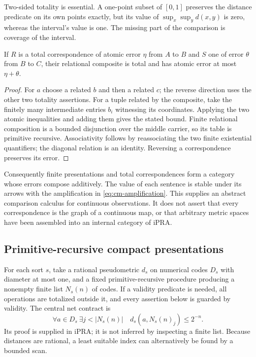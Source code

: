 Two-sided totality is essential. A one-point subset of $[0,1]$ preserves
the distance predicate on its own points exactly, but its value of
$\sup_x\sup_y d(x,y)$ is zero, whereas the interval's value is one.
The missing part of the comparison is coverage of the interval.

\begin{proposition}
\label{prop:cm-compose}
If $R$ is a total correspondence of atomic error $\eta$ from $A$ to $B$
and $S$ one of error $\theta$ from $B$ to $C$, their relational composite
is total and has atomic error at most $\eta+\theta$.
\end{proposition}
\begin{proof}
For $a$ choose a related $b$ and then a related $c$; the reverse direction
uses the other two totality assertions. For a tuple related by the
composite, take the finitely many intermediate entries $b_i$ witnessing
its coordinates. Applying the two atomic inequalities and adding them
gives the stated bound. Finite relational composition is a bounded
disjunction over the middle carrier, so its table is primitive recursive.
Associativity follows by reassociating the two finite existential
quantifiers; the diagonal relation is an identity. Reversing a
correspondence preserves its error.
\end{proof}

Consequently finite presentations and total correspondences form a
category whose errors compose additively. The value of each sentence
is stable under its arrows with the amplification in
\eqref{eq:cm-amplification}. This supplies an abstract comparison
calculus for continuous observations. It does not assert that every
correspondence is the graph of a continuous map, or that arbitrary
metric spaces have been assembled into an internal category of iPRA.

\subsection{Primitive-recursive compact presentations}
\label{subsec:cm-presentations}

For each sort $s$, take a rational pseudometric $d_s$ on numerical
codes $D_s$ with diameter at most one, and a fixed primitive-recursive
procedure producing a nonempty finite list $N_s(n)$ of codes. If a
validity predicate is needed, all operations are totalized outside it,
and every assertion below is guarded by validity. The central net
contract is
\begin{equation}
 \forall a\in D_s\ \exists j<|N_s(n)|\quad
 d_s(a,N_s(n)_j)\leq 2^{-n}.
 \label{eq:cm-net}
\end{equation}
Its proof is supplied in iPRA; it is not inferred by inspecting a
finite list. Because distances are rational, a least suitable index
can alternatively be found by a bounded scan.

